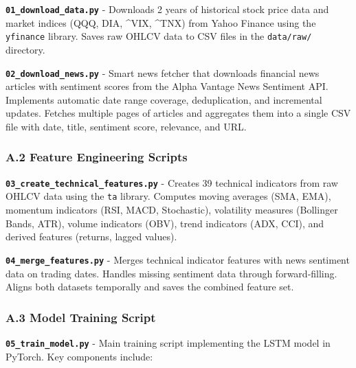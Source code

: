 \documentclass[
]{article}
\begin{document}
\textbf{\texttt{01\_download\_data.py}} - Downloads 2 years of
historical stock price data and market indices (QQQ, DIA, \^{}VIX,
\^{}TNX) from Yahoo Finance using the \texttt{yfinance} library. Saves
raw OHLCV data to CSV files in the \texttt{data/raw/} directory.

\textbf{\texttt{02\_download\_news.py}} - Smart news fetcher that
downloads financial news articles with sentiment scores from the Alpha
Vantage News Sentiment API. Implements automatic date range coverage,
deduplication, and incremental updates. Fetches multiple pages of
articles and aggregates them into a single CSV file with date, title,
sentiment score, relevance, and URL.

\subsubsection{A.2 Feature Engineering
Scripts}\label{a2-feature-engineering-scripts}

\textbf{\texttt{03\_create\_technical\_features.py}} - Creates 39
technical indicators from raw OHLCV data using the \texttt{ta} library.
Computes moving averages (SMA, EMA), momentum indicators (RSI, MACD,
Stochastic), volatility measures (Bollinger Bands, ATR), volume
indicators (OBV), trend indicators (ADX, CCI), and derived features
(returns, lagged values).

\textbf{\texttt{04\_merge\_features.py}} - Merges technical indicator
features with news sentiment data on trading dates. Handles missing
sentiment data through forward-filling. Aligns both datasets temporally
and saves the combined feature set.

\subsubsection{A.3 Model Training
Script}\label{a3-model-training-script}

\textbf{\texttt{05\_train\_model.py}} - Main training script
implementing the LSTM model in PyTorch. Key components include:
\end{document}

